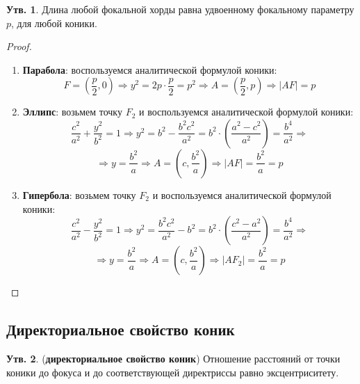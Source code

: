 \documentclass[12pt]{article}
\theoremstyle{definition}
\newtheorem{prop}{Утв.}
\begin{document}
\begin{prop}
	Длина любой фокальной хорды равна удвоенному фокальному параметру $p$, для любой коники.
\end{prop}
\begin{proof}\hfill
	\begin{enumerate}[label=\arabic*)]
		\item \textbf{Парабола}: воспользуемся аналитической формулой коники:
		$$
			F = \left(\dfrac{p}{2}, 0\right) \Rightarrow y^2 = 2p{\cdot}\dfrac{p}{2} = p^2 \Rightarrow A = \left(\dfrac{p}{2},p\right) \Rightarrow |AF| = p
		$$
		\item \textbf{Эллипс}: возьмем точку $F_2$ и воспользуемся аналитической формулой коники:
		$$
			\dfrac{c^2}{a^2} + \dfrac{y^2}{b^2} = 1 \Rightarrow y^2 = b^2 - \dfrac{b^2c^2}{a^2} = b^2{\cdot}\left(\dfrac{a^2 - c^2}{a^2}\right) = \dfrac{b^4}{a^2} \Rightarrow 
		$$
		$$	
			\Rightarrow y = \dfrac{b^2}{a} \Rightarrow A = \left(c, \dfrac{b^2}{a}\right) \Rightarrow |AF| = \dfrac{b^2}{a} = p
		$$
		\item \textbf{Гипербола}: возьмем точку $F_2$ и воспользуемся аналитической формулой коники:
		$$
			\dfrac{c^2}{a^2} - \dfrac{y^2}{b^2} = 1 \Rightarrow y^2 = \dfrac{b^2c^2}{a^2} - b^2 = b^2{\cdot}\left(\dfrac{c^2 - a^2}{a^2}\right) = \dfrac{b^4}{a^2} \Rightarrow 
		$$
		$$	
			\Rightarrow y = \dfrac{b^2}{a} \Rightarrow A = \left(c, \dfrac{b^2}{a}\right) \Rightarrow |AF_2| = \dfrac{b^2}{a} = p
		$$
	\end{enumerate}
\end{proof}

\subsection*{Директориальное свойство коник}

\begin{prop}(\textbf{директориальное свойство коник})
	Отношение расстояний от точки коники до фокуса и до соответствующей директриссы равно эксцентриситету.	
\end{prop}
\end{document}
